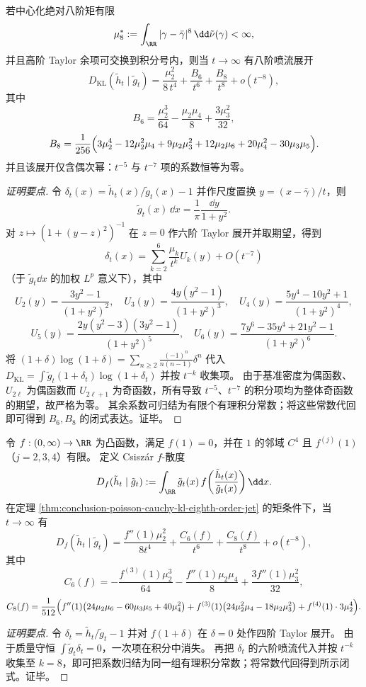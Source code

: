 \begin{theorem}[KL 相对熵的八阶喷流与奇次项消隐]\label{thm:conclusion-poisson-cauchy-kl-eighth-order-jet}
若中心化绝对八阶矩有限
\[
\mu_8^\ast:=\int_{\RR}|\gamma-\bar\gamma|^8\,\dd\tilde\nu(\gamma)<\infty,
\]
并且高阶 Taylor 余项可交换到积分号内，则当 \(t\to\infty\) 有八阶喷流展开
\[
D_{\mathrm{KL}}(\tilde h_t\mid \tilde g_t)
=\frac{\mu_2^2}{8\,t^4}+\frac{B_6}{t^6}+\frac{B_8}{t^8}+o(t^{-8}),
\]
其中
\[
B_6=\frac{\mu_2^3}{64}-\frac{\mu_2\mu_4}{8}+\frac{3\mu_3^2}{32},
\]
\[
B_8=\frac1{256}\Bigl(3\mu_2^4-12\mu_2^2\mu_4+9\mu_2\mu_3^2+12\mu_2\mu_6+20\mu_4^2-30\mu_3\mu_5\Bigr).
\]
并且该展开仅含偶次幂：\(t^{-5}\) 与 \(t^{-7}\) 项的系数恒等为零。
\end{theorem}
\begin{proof}[证明要点]
令 \(\delta_t(x)=\tilde h_t(x)/\tilde g_t(x)-1\) 并作尺度置换 \(y=(x-\bar\gamma)/t\)，则
\[
\tilde g_t(x)\,\dd x=\frac{1}{\pi}\frac{\dd y}{1+y^2}.
\]
对 \(z\mapsto (1+(y-z)^2)^{-1}\) 在 \(z=0\) 作六阶 Taylor 展开并取期望，得到
\[
\delta_t(x)=\sum_{k=2}^{6}\frac{\mu_k}{t^k}U_k(y)+O(t^{-7})
\]
（于 \(\tilde g_t\dd x\) 的加权 \(L^p\) 意义下），其中
\[
U_2(y)=\frac{3y^2-1}{(1+y^2)^2},\quad
U_3(y)=\frac{4y(y^2-1)}{(1+y^2)^3},\quad
U_4(y)=\frac{5y^4-10y^2+1}{(1+y^2)^4},
\]
\[
U_5(y)=\frac{2y(y^2-3)(3y^2-1)}{(1+y^2)^5},\quad
U_6(y)=\frac{7y^6-35y^4+21y^2-1}{(1+y^2)^6}.
\]
将
\(
(1+\delta)\log(1+\delta)=\sum_{n\ge 2}\frac{(-1)^n}{n(n-1)}\delta^n
\)
代入
\(
D_{\mathrm{KL}}=\int \tilde g_t(1+\delta_t)\log(1+\delta_t)
\)
并按 \(t^{-k}\) 收集项。
由于基准密度为偶函数、\(U_{2\ell}\) 为偶函数而 \(U_{2\ell+1}\) 为奇函数，所有导致 \(t^{-5}\)、\(t^{-7}\) 的积分项均为整体奇函数的期望，故严格为零。
其余系数可归结为有限个有理积分常数；将这些常数代回即可得到 \(B_6,B_8\) 的闭式表达。证毕。
\end{proof}

\begin{theorem}\label{thm:conclusion-poisson-cauchy-fdiv-eighth-order-jet}
令 \(f:(0,\infty)\to\RR\) 为凸函数，满足 \(f(1)=0\)，并在 \(1\) 的邻域 \(C^4\) 且 \(f^{(j)}(1)\)（\(j=2,3,4\)）有限。
定义 Csisz\'ar \texorpdfstring{$f$}{f}-散度
\[
D_f(\tilde h_t\mid\tilde g_t):=\int_{\RR}\tilde g_t(x)\,f\!\left(\frac{\tilde h_t(x)}{\tilde g_t(x)}\right)\dd x.
\]
在定理 \ref{thm:conclusion-poisson-cauchy-kl-eighth-order-jet} 的矩条件下，当 \(t\to\infty\) 有
\[
D_f(\tilde h_t\mid\tilde g_t)
=\frac{f''(1)\mu_2^2}{8t^4}+\frac{C_6(f)}{t^6}+\frac{C_8(f)}{t^8}+o(t^{-8}),
\]
其中
\[
C_6(f)=-\frac{f^{(3)}(1)\mu_2^3}{64}-\frac{f''(1)\mu_2 \mu_4}{8}+\frac{3f''(1)\mu_3^2}{32},
\]
\[
C_8(f)=\frac1{512}\Bigl(
f''(1)\bigl(24\mu_2 \mu_6-60\mu_3\mu_5+40\mu_4^2\bigr)
+f^{(3)}(1)\bigl(24\mu_2^2\mu_4-18\mu_2\mu_3^2\bigr)
+f^{(4)}(1)\cdot 3\mu_2^4
\Bigr).
\]
\end{theorem}
\begin{proof}[证明要点]
令 \(\delta_t=\tilde h_t/\tilde g_t-1\) 并对 \(f(1+\delta)\) 在 \(\delta=0\) 处作四阶 Taylor 展开。
由于质量守恒 \(\int \tilde g_t\delta_t=0\)，一次项在积分中消失。
再把 \(\delta_t\) 的六阶喷流代入并按 \(t^{-k}\) 收集至 \(k=8\)，即可把系数归结为同一组有理积分常数；将常数代回得到所示闭式。证毕。
\end{proof}

